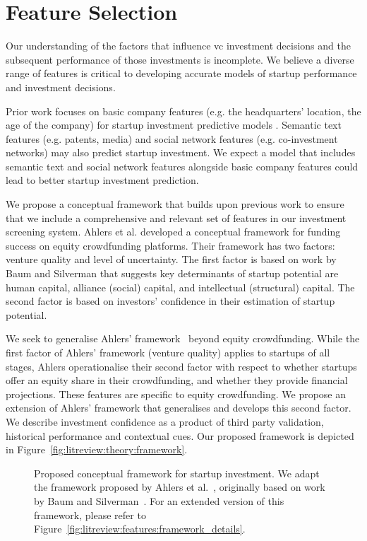 \documentclass[../thesis/thesis.tex]{subfiles}
\begin{document}
\section{Feature Selection}

Our understanding of the factors that influence \gls{vc} investment decisions and the subsequent performance of those investments is incomplete. We believe a diverse range of features is critical to developing accurate models of startup performance and investment decisions.

Prior work focuses on basic company features (e.g. the headquarters' location, the age of the company) for startup investment predictive models \cite{beckwith2016, gimmon2010}. Semantic text features (e.g. patents, media) \cite{hoenen2014, yuan2016} and social network features (e.g. co-investment networks) \cite{werth2013, cheng2016, yu2015} may also predict startup investment. We expect a model that includes semantic text and social network features alongside basic company features could lead to better startup investment prediction.

We propose a conceptual framework that builds upon previous work to ensure that we include a comprehensive and relevant set of features in our investment screening system.  Ahlers et al. \cite{ahlers2015} developed a conceptual framework for funding success on equity crowdfunding platforms. Their framework has two factors: venture quality and level of uncertainty. The first factor is based on work by Baum and Silverman \cite{baum2004} that suggests key determinants of startup potential are human capital, alliance (social) capital, and intellectual (structural) capital. The second factor is based on investors' confidence in their estimation of startup potential.

We seek to generalise Ahlers' framework~\cite{ahlers2015} beyond equity crowdfunding. While the first factor of Ahlers' framework (venture quality) applies to startups of all stages, Ahlers operationalise their second factor with respect to whether startups offer an equity share in their crowdfunding, and whether they provide financial projections. These features are specific to equity crowdfunding. We propose an extension of Ahlers' framework that generalises and develops this second factor. We describe investment confidence as a product of third party validation, historical performance and contextual cues. Our proposed framework is depicted in Figure~\ref{fig:litreview:theory:framework}.

\begin{figure}[!htb]
    \centering
    
    \caption{Proposed conceptual framework for startup investment. We adapt the framework proposed by Ahlers et al.~\cite{ahlers2015}, originally based on work by Baum and Silverman~\cite{baum2004}. For an extended version of this framework, please refer to Figure~\ref{fig:litreview:features:framework_details}.}
    \label{fig:litreview:features:framework_simple}
\end{figure}
\end{document}

